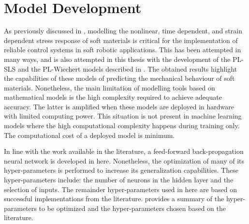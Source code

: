 \section{Model Development}

As previously discussed in , modelling the nonlinear, time dependent, and strain dependent stress response of soft materials is critical for the implementation of reliable control systems in soft robotic applications. This has been attempted in many ways, and is also attempted in this thesis with the development of the PL-SLS and the PL-Wiechert models described in . The obtained results highlight the capabilities of these models of predicting the mechanical behaviour of soft materials. Nonetheless, the main limitation of modelling tools based on mathematical models is the high complexity required to achieve adequate accuracy. The latter is amplified when these models are deployed in hardware with limited computing power. This situation is not present in machine learning models where the high computational complexity happens during training only. The computational cost of a deployed model is minimum.

In line with the work available in the literature, a feed-forward back-propagation neural network is developed in here. Nonetheless, the optimization of many of its hyper-parameters is performed to increase its generalization capabilities. These hyper-parameters include: the number of neurons in the hidden layer and the selection of inputs. The remainder hyper-parameters used in here are based on successful implementations from the literature.  provides a summary of the hyper-parameters to be optimized and the hyper-parameters chosen based on the literature.

